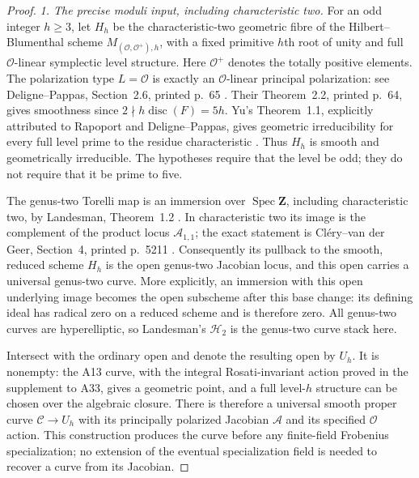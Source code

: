 \begin{proof}
\emph{1. The precise moduli input, including characteristic two.}
For an odd integer $h\geq3$, let $H_h$ be the characteristic-two
geometric fibre of the Hilbert--Blumenthal scheme
$M_{(\mathcal O,\mathcal O^+),h}$, with a fixed primitive $h$th root of
unity and full $\mathcal O$-linear symplectic level structure.
Here $\mathcal O^+$ denotes the totally positive elements.
The polarization type $L=\mathcal O$ is exactly an
$\mathcal O$-linear principal polarization: see Deligne--Pappas,
Section~2.6, printed p.~65 \cite{DelignePappas1994}.
Their Theorem~2.2, printed p.~64, gives smoothness since
$2\nmid h\operatorname{disc}(F)=5h$.
Yu's Theorem~1.1, explicitly attributed to Rapoport and
Deligne--Pappas, gives geometric irreducibility for every full level
prime to the residue characteristic \cite[Theorem~1.1, author
manuscript p.~2]{Yu2009HB}.  Thus $H_h$ is smooth and geometrically
irreducible.  The hypotheses require that the level be odd;
they do not require that it be prime to five.

The genus-two Torelli map is an immersion over $\operatorname{Spec}
\mathbf Z$, including characteristic two, by Landesman,
Theorem~1.2 \cite{Landesman2021Torelli}.  In characteristic two its image
is the complement of the product locus $\mathcal A_{1,1}$; the exact
statement is Cl\'ery--van der Geer, Section~4, printed p.~5211
\cite{CleryVanderGeer2022}.  Consequently its pullback to the
smooth, reduced scheme $H_h$ is the open genus-two Jacobian locus,
and this open carries a universal genus-two curve.  More explicitly,
an immersion with this open underlying image becomes the open
subscheme after this base change: its defining ideal has radical
zero on a reduced scheme and is therefore zero.
All genus-two curves are hyperelliptic, so Landesman's
$\mathcal H_2$ is the genus-two curve stack here.

Intersect with the ordinary open and denote the resulting open by
$U_h$.  It is nonempty: the A13 curve, with the integral
Rosati-invariant action proved in the supplement to A33, gives a
geometric point, and a full level-$h$ structure can be chosen over
the algebraic closure.  There is therefore a universal smooth proper
curve $\mathcal C\to U_h$ with its principally polarized Jacobian
$\mathcal A$ and its specified $\mathcal O$ action.  This construction
produces the curve before any finite-field Frobenius specialization;
no extension of the eventual specialization field is needed to
recover a curve from its Jacobian.


\end{proof}
